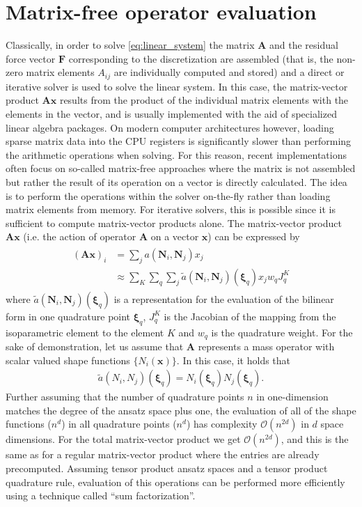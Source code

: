 \documentclass[times,doublespace]{nmeauth}
\newcommand*{\gz}[1]{\boldsymbol{#1}}
\begin{document}
\section{Matrix-free operator evaluation}
\label{sec:mf}
Classically, in order to solve \eqref{eq:linear_system} the matrix $\gz A$ and the residual force vector $\gz F$ corresponding to the discretization are assembled (that is, the non-zero matrix elements $A_{ij}$ are individually computed and stored) and a direct or iterative solver is used to solve the linear system.
In this case, the matrix-vector product $\gz A \gz x$ results from the product of the individual matrix elements with the elements in the vector, and is usually implemented with the aid of specialized linear algebra packages.
On modern computer architectures however, loading sparse matrix data into the CPU registers is significantly slower than performing the arithmetic operations when solving.
For this reason, recent implementations often focus on so-called matrix-free approaches where the matrix is not assembled but rather the result of its operation on a vector is directly calculated.
The idea is to perform the operations within the solver on-the-fly rather than loading matrix elements from memory.
For iterative solvers, this is possible since it is sufficient to compute matrix-vector products alone.
%
The matrix-vector product $\gz A \gz x$ (i.e. the action of operator $\gz A$ on a vector $\gz x$) can be expressed by
\begin{align}
  \begin{split}
 (\gz A \gz x)_i &= \sum_j a(\gz N_i,\gz N_j) x_j \\
        &\approx \sum_K \sum_q \sum_j \tilde{a}(\gz N_i,\gz N_j)(\gz \xi_q) x_j w_q J^K_q
  \end{split}
  \label{eq:mf_vmult}
\end{align}
where $\tilde{a}(\gz N_i,\gz N_j)(\gz \xi_q)$ is a representation for the evaluation of the bilinear form in one quadrature point $\gz \xi_q$, $J^K_q$ is the Jacobian of the mapping from the isoparametric element to the element $K$ and
$w_q$ is the quadrature weight.
For the sake of demonstration, let us assume that $\gz A$ represents a mass operator with scalar valued shape functions $\{ N_i(\gz x) \}$. In this case, it holds that
\begin{align*}
 \tilde{a}(N_i,N_j)(\gz \xi_q) = N_i(\gz \xi_q)N_j(\gz \xi_q).
\end{align*}
Further assuming that the number of quadrature points $n$ in one-dimension matches the degree of the ansatz space plus one, the evaluation of all of the shape functions ($n^d$)
in all quadrature points ($n^d$) has complexity $\mathcal{O}(n^{2d})$ in $d$ space dimensions.
For the total matrix-vector product we get $\mathcal{O}(n^{2d})$,
and this is the same as for a regular matrix-vector product where the entries are already precomputed. Assuming tensor product ansatz spaces and a tensor product quadrature rule, evaluation of this operations can be performed more efficiently using a technique called ``sum factorization''.
\end{document}
